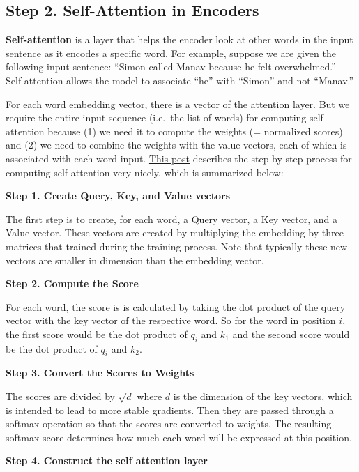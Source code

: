 \documentclass[
]{book}
\begin{document}
\hypertarget{step-2.-self-attention-in-encoders}{%
\subsection{Step 2. Self-Attention in Encoders}\label{step-2.-self-attention-in-encoders}}

\textbf{Self-attention} is a layer that helps the encoder look at other words in the input sentence as it encodes a specific word. For example, suppose we are given the following input sentence: ``Simon called Manav because he felt overwhelmed.'' Self-attention allows the model to associate ``he'' with ``Simon'' and not ``Manav.''

For each word embedding vector, there is a vector of the attention layer. But we require the entire input sequence (i.e.~the list of words) for computing self-attention because (1) we need it to compute the weights (= normalized scores) and (2) we need to combine the weights with the value vectors, each of which is associated with each word input. \href{https://jalammar.github.io/illustrated-transformer/}{This post} describes the step-by-step process for computing self-attention very nicely, which is summarized below:

\textbf{Step 1. Create Query, Key, and Value vectors}

The first step is to create, for each word, a Query vector, a Key vector, and a Value vector. These vectors are created by multiplying the embedding by three matrices that trained during the training process. Note that typically these new vectors are smaller in dimension than the embedding vector.

\textbf{Step 2. Compute the Score}

For each word, the score is is calculated by taking the dot product of the query vector with the key vector of the respective word. So for the word in position \(i\), the first score would be the dot product of \(q_i\) and \(k_1\) and the second score would be the dot product of \(q_i\) and \(k_2\).

\textbf{Step 3. Convert the Scores to Weights}

The scores are divided by \(\sqrt{d}\) where \(d\) is the dimension of the key vectors, which is intended to lead to more stable gradients. Then they are passed through a softmax operation so that the scores are converted to weights. The resulting softmax score determines how much each word will be expressed at this position.

\textbf{Step 4. Construct the self attention layer}
\end{document}
